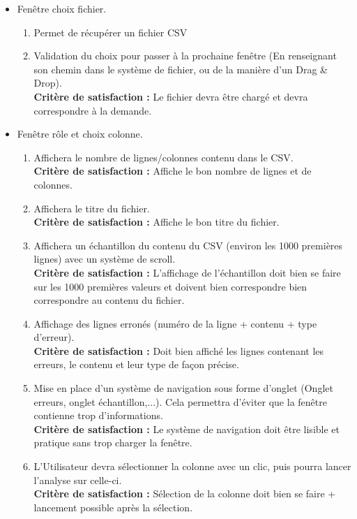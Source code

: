 \begin{itemize}
			\item Fenêtre choix fichier.
				\begin{enumerate}
					\item Permet de récupérer un fichier CSV
					\item Validation du choix pour passer à la prochaine fenêtre (En renseignant son chemin dans le système de fichier, ou de la manière d'un Drag \& Drop). \\
					\textbf{Critère de satisfaction : }Le fichier devra être chargé  et devra correspondre à la demande.
				\end{enumerate}
			\item Fenêtre rôle et choix colonne.		
				\begin{enumerate}
				\item Affichera le nombre de lignes/colonnes contenu dans le CSV.\\
				\textbf{Critère de satisfaction : } Affiche le bon nombre de lignes et de colonnes.
				\item Affichera le titre du fichier. \\
				\textbf{Critère de satisfaction : } Affiche le bon titre du fichier.
				\item Affichera un échantillon du contenu du CSV (environ les 1000 premières lignes) avec un système de scroll.\\ 
				\textbf{Critère de satisfaction : } L'affichage de l'échantillon doit bien se faire sur les 1000 premières valeurs et doivent bien correspondre bien correspondre au contenu du fichier. 
				\item Affichage des lignes erronés (numéro de la ligne + contenu + type d'erreur).\\
				 \textbf{Critère de satisfaction : } Doit bien affiché les lignes contenant les erreurs, le contenu et leur type de façon précise.
				\item Mise en place d'un système de navigation sous forme d'onglet (Onglet erreurs, onglet échantillon,...). Cela permettra d'éviter que la fenêtre contienne trop d'informations. \\
				\textbf{Critère de satisfaction : } Le système de navigation doit être lisible et pratique sans trop charger la fenêtre.
				\item L'Utilisateur devra sélectionner la colonne avec un clic, puis pourra lancer l'analyse sur celle-ci. \\
				\textbf{Critère de satisfaction : } Sélection de la colonne doit bien se faire + lancement possible après la sélection.

\end{enumerate}
\end{itemize}
